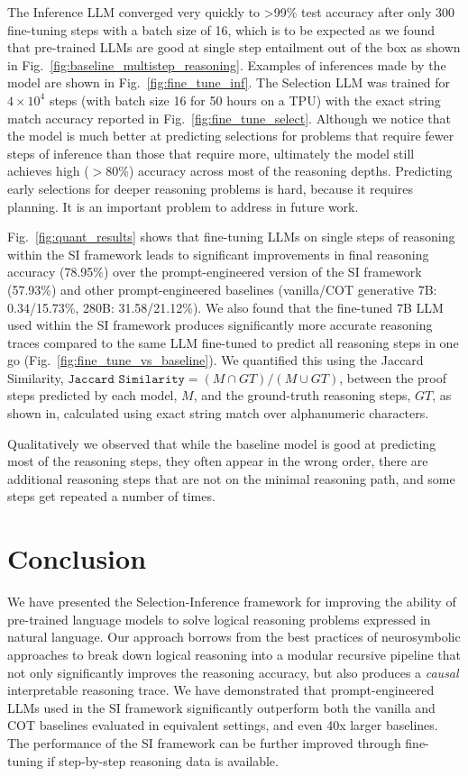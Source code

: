The Inference LLM converged very quickly to >99\% test accuracy after only 300 fine-tuning steps with a batch size of 16, which is to be expected as we found that pre-trained LLMs are good at single step entailment out of the box as shown in Fig.~\ref{fig:baseline_multistep_reasoning}. Examples of inferences made by the model are shown in Fig.~\ref{fig:fine_tune_inf}. The Selection LLM was trained for $4\times10^4$ steps (with batch size 16 for 50 hours on a TPU) with the exact string match accuracy reported in Fig.~\ref{fig:fine_tune_select}. Although we notice that the model is much better at predicting selections for problems that require fewer steps of inference than those that require more, ultimately the model still achieves high ($>80\%$) accuracy across most of the reasoning depths. Predicting early selections for deeper reasoning problems is hard, because it requires planning. It is an important problem to address in future work.

Fig.~\ref{fig:quant_results} shows that fine-tuning LLMs on single steps of reasoning within the SI framework leads to significant improvements in final reasoning accuracy (78.95\%) over the prompt-engineered version of the SI framework (57.93\%) and other prompt-engineered baselines (vanilla/COT generative 7B: 0.34/15.73\%, 280B: 31.58/21.12\%). We also found that the fine-tuned 7B LLM used within the SI framework produces significantly more accurate reasoning traces compared to the same LLM fine-tuned to predict all reasoning steps in one go (Fig.~\ref{fig:fine_tune_vs_baseline}). We quantified this using the Jaccard Similarity, $\texttt{Jaccard Similarity} = (M \cap GT) / (M \cup  GT)$, between the proof steps predicted by each model, $M$, and the ground-truth reasoning steps, $GT$, as shown in, calculated using exact string match over alphanumeric characters.

Qualitatively we observed that while the baseline model is good at predicting most of the reasoning steps, they often appear in the wrong order, there are additional reasoning steps that are not on the minimal reasoning path, and some steps get repeated a number of times. 

\section{Conclusion}\label{sec:conclusion}
We have presented the Selection-Inference framework for improving the ability of pre-trained language models to solve logical reasoning problems expressed in natural language. Our approach borrows from the best practices of neurosymbolic approaches to break down logical reasoning into a modular recursive pipeline that not only significantly improves the reasoning accuracy, but also produces a \emph{causal} interpretable reasoning trace. We have demonstrated that prompt-engineered LLMs used in the SI framework significantly outperform both the vanilla and COT baselines evaluated in equivalent settings, and even 40x larger baselines. The performance of the SI framework can be further improved through fine-tuning if step-by-step reasoning data is available.

